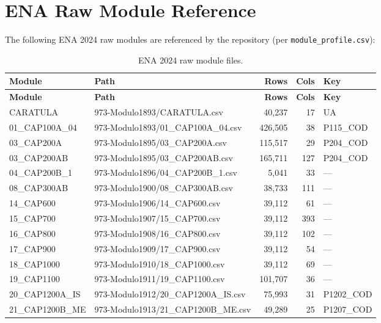 \documentclass[11pt,a4paper]{article}
\begin{document}
\newpage
\section{ENA Raw Module Reference}

The following ENA 2024 raw modules are referenced by the repository (per \texttt{module\_profile.csv}):

\begin{longtable}{L{3cm}L{5cm}rrl}
\caption{ENA 2024 raw module files.} \\
\toprule
\textbf{Module} & \textbf{Path} & \textbf{Rows} & \textbf{Cols} & \textbf{Key} \\
\midrule
\endfirsthead
\toprule
\textbf{Module} & \textbf{Path} & \textbf{Rows} & \textbf{Cols} & \textbf{Key} \\
\midrule
\endhead
\bottomrule
\endlastfoot
CARATULA & 973-Modulo1893/CARATULA.csv & 40,237 & 17 & UA \\
01\_CAP100A\_04 & 973-Modulo1893/01\_CAP100A\_04.csv & 426,505 & 38 & P115\_COD \\
03\_CAP200A & 973-Modulo1895/03\_CAP200A.csv & 115,517 & 29 & P204\_COD \\
03\_CAP200AB & 973-Modulo1895/03\_CAP200AB.csv & 165,711 & 127 & P204\_COD \\
04\_CAP200B\_1 & 973-Modulo1896/04\_CAP200B\_1.csv & 5,041 & 33 & --- \\
08\_CAP300AB & 973-Modulo1900/08\_CAP300AB.csv & 38,733 & 111 & --- \\
14\_CAP600 & 973-Modulo1906/14\_CAP600.csv & 39,112 & 61 & --- \\
15\_CAP700 & 973-Modulo1907/15\_CAP700.csv & 39,112 & 393 & --- \\
16\_CAP800 & 973-Modulo1908/16\_CAP800.csv & 39,112 & 102 & --- \\
17\_CAP900 & 973-Modulo1909/17\_CAP900.csv & 39,112 & 54 & --- \\
18\_CAP1000 & 973-Modulo1910/18\_CAP1000.csv & 39,112 & 69 & --- \\
19\_CAP1100 & 973-Modulo1911/19\_CAP1100.csv & 101,707 & 36 & --- \\
20\_CAP1200A\_IS & 973-Modulo1912/20\_CAP1200A\_IS.csv & 75,993 & 31 & P1202\_COD \\
21\_CAP1200B\_ME & 973-Modulo1913/21\_CAP1200B\_ME.csv & 49,289 & 25 & P1207\_COD \\
\end{longtable}
\end{document}
